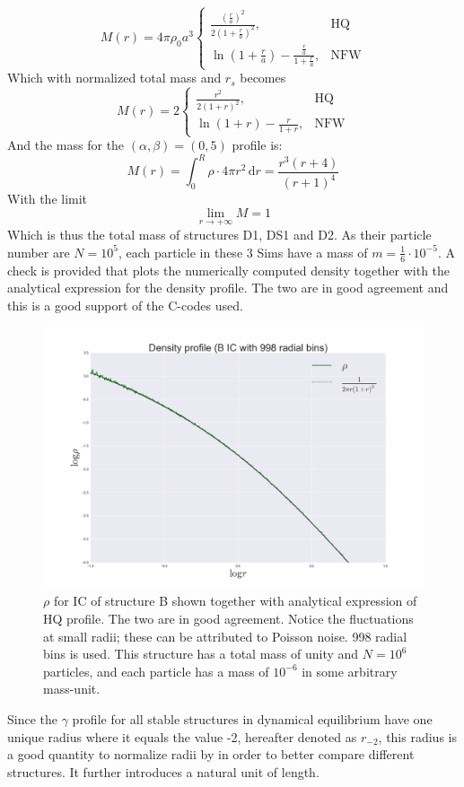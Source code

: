 \begin{equation}
    M(r)= 4\pi \rho_0 a^3  
\begin{cases}
    \frac{(\frac{r}{a})^2}{2(1+\frac{r}{a})^2},& \text{HQ} \\
    \ln(1 + \frac{r}{a}) - \frac{\frac{r}{a}}{1 + \frac{r}{a}},& \text{NFW}
\end{cases}
\end{equation}
Which with normalized total mass and $r_s$ becomes
\begin{equation}
    M(r)= 2  
\begin{cases}
    \frac{r^2}{2(1+r)^2},& \text{HQ} \\
    \ln(1+r) - \frac{r}{1 + r},& \text{NFW}
\end{cases}
\end{equation}
And the mass for the $(\alpha,\beta)=(0,5)$ profile is:
\begin{equation} 
M(r) = \int_{0}^{R} \! \rho \cdot 4\pi r^2 \, \mathrm{d}r = 
 \frac{r^3(r+4)}{(r+1)^4}
\end{equation}
With the limit
\begin{equation} 
\lim_{r \to +\infty} M = 1
\end{equation}
Which is thus the total mass of structures D1, DS1 and D2. As their particle number are $N = 10^5$, each particle in these 3 Sims have a mass of $m = \frac{1}{6} \cdot 10^{-5}$. A check is provided that plots the numerically computed density together with the analytical expression for the density profile. The two are in good agreement and this is a good support of the C-codes used.
\begin{figure}[!htbp]
\centering
\includegraphics[width=1.0\linewidth]{img/B_Density_fit.png}
\caption{$\rho$ for IC of structure B shown together with analytical expression of HQ profile. The two are in good agreement. Notice the fluctuations at small radii; these can be attributed to Poisson noise. 998 radial bins is used. This structure has a total mass of unity and $N=10^6$ particles, and each particle has a mass of $10^{-6}$ in some arbitrary mass-unit.}
\label{fig:test}
\end{figure}
Since the $\gamma$ profile for all stable structures in dynamical equilibrium have one unique radius where it equals the value -2, hereafter denoted as $r_{-2}$, this radius is a good quantity to normalize radii by in order to better compare different structures. It further introduces a natural unit of length.